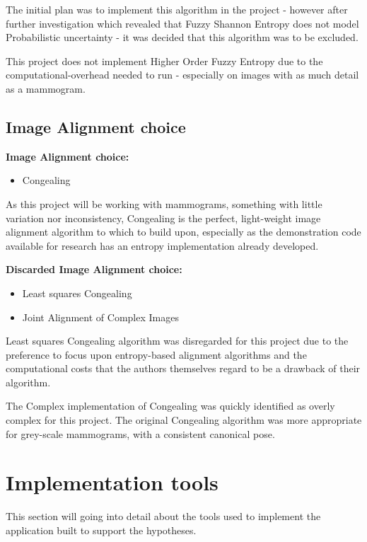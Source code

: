 The initial plan was to implement this algorithm in the project - however after further investigation which revealed that Fuzzy Shannon Entropy does not model Probabilistic uncertainty - it was decided that this algorithm was to be excluded.

This project does not implement Higher Order Fuzzy Entropy due to the computational-overhead needed to run - especially on images with as much detail as a mammogram.


\subsection{Image Alignment choice}

\textbf{Image Alignment choice:}
\begin{itemize}
    \item \Gls{Congealing}
\end{itemize}

As this project will be working with mammograms, something with little variation nor inconsistency, \Gls{Congealing} is the perfect, light-weight image alignment algorithm to which to build upon, especially as the demonstration code available for research has an entropy implementation already developed.

\textbf{Discarded Image Alignment choice:}
\begin{itemize}
    \item Least squares \gls{Congealing}
    \item Joint Alignment of Complex Images
\end{itemize}

Least squares \gls{Congealing} algorithm was disregarded for this project due to the preference to focus upon entropy-based alignment algorithms and the computational costs that the authors themselves regard to be a drawback of their algorithm.

The Complex implementation of \Gls{Congealing} was quickly identified as overly complex for this project. The original \Gls{Congealing} algorithm was more appropriate for grey-scale mammograms, with a consistent canonical pose.



\section{Implementation tools}

This section will going into detail about the tools used to implement the application built to support the hypotheses.

